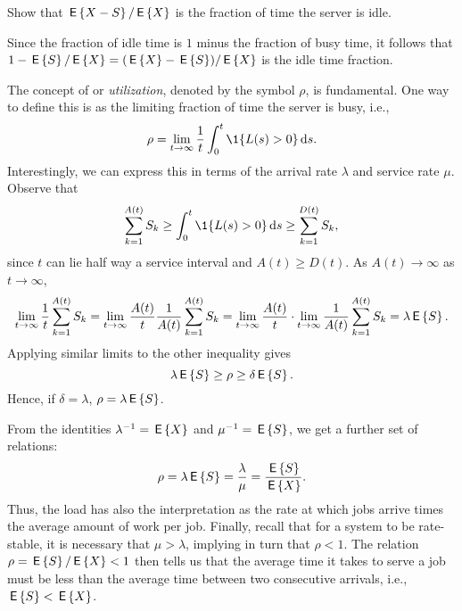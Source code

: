 \begin{exercise}
 Show that $\,\mathsf{E}\left\{X - S\right\}/\,\mathsf{E}\left\{X\right\}$ is the fraction of time
  the server is idle.
  \begin{solution}
    Since the fraction of idle time is $1$ minus the fraction of busy
    time, it follows that $1-\,\mathsf{E}\left\{S\right\}/ \,\mathsf{E}\left\{X\right\} = (\,\mathsf{E}\left\{X\right\} - \,\mathsf{E}\left\{S\right\})/\,\mathsf{E}\left\{X\right\}$ is the
    idle time fraction.
  \end{solution}
\end{exercise}

The concept of  or \emph{utilization}, denoted by the
symbol $\rho$, is fundamental. One way to define this is  as the limiting
fraction of time the server is busy, i.e.,
\begin{equation*}
  \rho = \lim_{t\to\infty} \frac 1 t \int_0^t \1{L(s)>0} \d s.
\end{equation*}
Interestingly, we can express this in terms of the arrival rate
$\lambda$ and service rate $\mu$. Observe that
\begin{equation*}
  \sum_{k=1}^{A(t)} S_k \geq \int_0^t \1{L(s)>0} \d s \geq   \sum_{k=1}^{D(t)} S_k,
\end{equation*}
since $t$ can lie half way a service interval and $A(t) \geq D(t)$. As
$A(t)\to \infty$ as $t\to\infty$,
\begin{equation*}
  \lim_{t\to\infty} \frac 1 t\sum_{k=1}^{A(t)} S_k = 
  \lim_{t\to\infty} \frac{A(t)}t \frac{1}{A(t)} \sum_{k=1}^{A(t)} S_k = 
  \lim_{t\to\infty} \frac{A(t)}t \cdot \lim_{t\to\infty}\frac{1}{A(t)} \sum_{k=1}^{A(t)} S_k = \lambda \,\mathsf{E}\left\{S\right\}.
\end{equation*}
Applying similar limits to the other inequality gives
\begin{equation*}
\lambda \,\mathsf{E}\left\{S\right\} \geq \rho \geq \delta \,\mathsf{E}\left\{S\right\}.
\end{equation*}
Hence, if $\delta=\lambda$, $\rho = \lambda \,\mathsf{E}\left\{S\right\}$.  

From the identities $\lambda^{-1} = \,\mathsf{E}\left\{X\right\}$ and $\mu^{-1} = \,\mathsf{E}\left\{S\right\}$, we get
a further set of relations:
\begin{equation*}
  \rho = \lambda \,\mathsf{E}\left\{S\right\} = \frac{\lambda}{\mu} = \frac{\,\mathsf{E}\left\{S\right\}}{\,\mathsf{E}\left\{X\right\}}.
\end{equation*}
Thus, the load has also the interpretation as the rate at which jobs
arrive times the average amount of work per job.  Finally,
recall that for a system to be rate-stable, it is necessary that
$\mu> \lambda$, implying in turn that $\rho < 1$. The relation
$\rho=\,\mathsf{E}\left\{S\right\}/ \,\mathsf{E}\left\{X\right\} < 1$ then tells us that the average time it takes to
serve a job must be less than the average time between two consecutive
arrivals, i.e., $\,\mathsf{E}\left\{S\right\} < \,\mathsf{E}\left\{X\right\}$.


